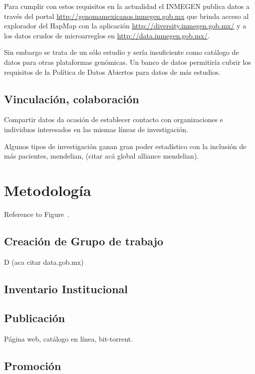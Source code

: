 \documentclass[
10pt, %
letterpaper, %
oneside, %
headinclude,footinclude, %
BCOR5mm, %
]{scrartcl}
\begin{document}
Para cumplir con estos requisitos en la actualidad el INMEGEN publica
datos a través del portal \url{http://genomamexicanos.inmegen.gob.mx} que
brinda acceso al explorador del HapMap con la aplicación
\url{http://diversity.inmegen.gob.mx/} y a los datos crudos de microarreglos
en \url{http://data.inmegen.gob.mx/}.

Sin embargo se trata de un sólo estudio y sería insuficiente como
catálogo de datos para otras plataformas genómicas. Un banco de datos
permitiría cubrir los requisitos de la Política de Datos Abiertos para
datos de más estudios.


\subsection{Vinculación, colaboración}
Compartir datos da ocasión de establecer contacto con organizaciones e
individuos interesados en las mismas líneas de investigación.

Algunos tipos de investigación ganan gran poder estadístico con la
inclusión de más pacientes, mendelian, (citar acá global alliance
mendelian). 


\section{Metodología}
Reference to Figure~. %


\subsection{Creación de Grupo de trabajo}
D
(aca citar data.gob.mx)

\subsection{Inventario Institucional}
\cite{_nih_????}

\subsection{Publicación}
Página web, catálogo en línea, bit-torrent.

\subsection{Promoción}
\cite{schofield_post-publication_2009}



\renewcommand{\refname}{\spacedlowsmallcaps{References}} %



%


\end{document}
